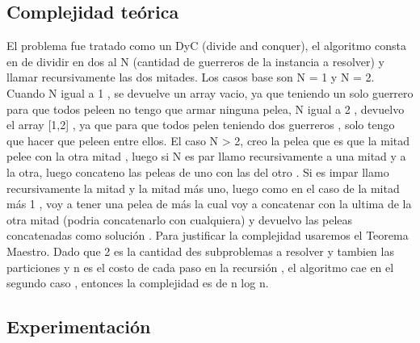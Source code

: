         

    \subsection{Complejidad teórica}
        El problema fue tratado como un DyC (divide and conquer), el algoritmo consta en de dividir en dos al N (cantidad de guerreros de la instancia a resolver) y llamar recursivamente las dos mitades. Los casos base son N = 1 y N = 2. Cuando N igual a 1 , se devuelve un array vacio, ya que teniendo un solo guerrero para que todos peleen no tengo que armar ninguna pelea, N igual a 2 , devuelvo el array [1,2] , ya que para que todos pelen teniendo dos guerreros , solo tengo que hacer que peleen entre ellos.
        El caso N > 2, creo la pelea que es que la mitad  pelee con la otra mitad , luego si N es par llamo recursivamente a una mitad y a la otra, luego concateno las peleas de uno con las del otro . Si es impar llamo recursivamente la mitad y la mitad más uno, luego como en el caso de la mitad más 1 , voy a tener una pelea de más la cual voy a concatenar con la ultima de la otra mitad (podria concatenarlo con cualquiera) y devuelvo las peleas concatenadas como solución . 
        Para justificar la complejidad usaremos el Teorema Maestro. Dado que 2 es la cantidad des subproblemas a resolver y tambien las particiones y n es el costo de cada paso en la recursión , el algoritmo cae en el segundo caso , entonces la complejidad es de n log n.




    \subsection{Experimentación}
